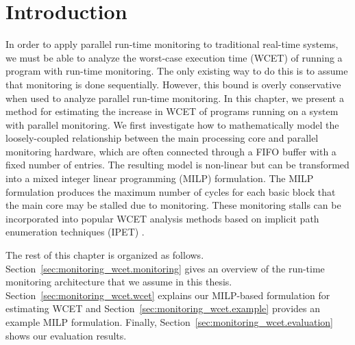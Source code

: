 \section{Introduction}
\label{sec:monitoring_wcet.introduction}

In order to apply parallel run-time monitoring to traditional real-time systems, we must
be able to analyze the worst-case execution time (WCET) of running a program
with run-time monitoring. The only existing way to do this is to assume that
monitoring is done sequentially. However, this bound is overly conservative when used to analyze parallel run-time monitoring.
In this chapter, we present a method for estimating the increase in WCET of
programs running on a system with parallel monitoring. We first investigate how
to mathematically model the loosely-coupled relationship between the main 
processing core and parallel monitoring hardware, which are often connected
through a FIFO buffer with a fixed number of entries. The resulting model
is non-linear but can be transformed into a mixed integer linear programming (MILP) 
formulation.
The MILP formulation produces the maximum number of cycles for each basic block
that the main core may be stalled due to monitoring.
These monitoring stalls can be incorporated into popular
WCET analysis methods based on implicit path enumeration techniques (IPET)
\cite{li-ipet-dac95}.

The rest of this chapter is organized as follows.
Section~\ref{sec:monitoring_wcet.monitoring} gives an overview of the run-time
monitoring architecture that we assume in this thesis.
Section~\ref{sec:monitoring_wcet.wcet} explains our MILP-based formulation for
estimating WCET and Section~\ref{sec:monitoring_wcet.example} provides an
example MILP formulation. Finally, Section~\ref{sec:monitoring_wcet.evaluation}
shows our evaluation results.


